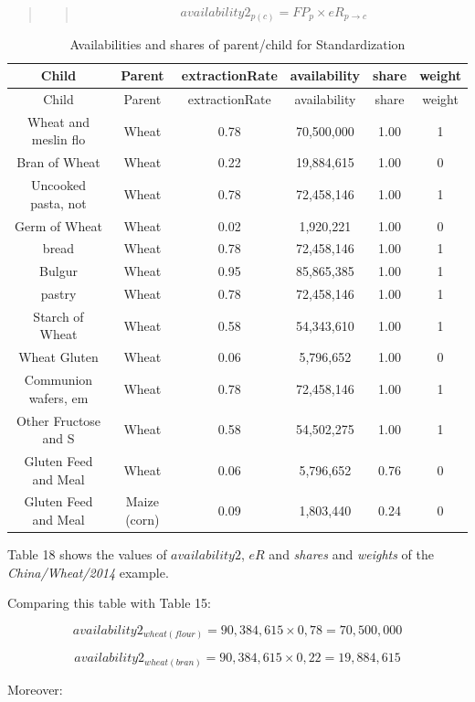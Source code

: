\documentclass[]{article}
\begin{document}
\begin{quote}
\begin{quote}
\begin{equation}
\label{eq:availability2}
availability2_{p(c)} = FP_{p}\times eR_{p\to c}
\end{equation}
\end{quote}
\end{quote}

\begin{longtable}[]{@{}cccccc@{}}
\caption{Availabilities and shares of parent/child for
Standardization}\tabularnewline
\toprule
Child & Parent & extractionRate & availability & share &
weight\tabularnewline
\midrule
\endfirsthead
\toprule
Child & Parent & extractionRate & availability & share &
weight\tabularnewline
\midrule
\endhead
Wheat and meslin flo & Wheat & 0.78 & 70,500,000 & 1.00 &
1\tabularnewline
Bran of Wheat & Wheat & 0.22 & 19,884,615 & 1.00 & 0\tabularnewline
Uncooked pasta, not & Wheat & 0.78 & 72,458,146 & 1.00 &
1\tabularnewline
Germ of Wheat & Wheat & 0.02 & 1,920,221 & 1.00 & 0\tabularnewline
bread & Wheat & 0.78 & 72,458,146 & 1.00 & 1\tabularnewline
Bulgur & Wheat & 0.95 & 85,865,385 & 1.00 & 1\tabularnewline
pastry & Wheat & 0.78 & 72,458,146 & 1.00 & 1\tabularnewline
Starch of Wheat & Wheat & 0.58 & 54,343,610 & 1.00 & 1\tabularnewline
Wheat Gluten & Wheat & 0.06 & 5,796,652 & 1.00 & 0\tabularnewline
Communion wafers, em & Wheat & 0.78 & 72,458,146 & 1.00 &
1\tabularnewline
Other Fructose and S & Wheat & 0.58 & 54,502,275 & 1.00 &
1\tabularnewline
Gluten Feed and Meal & Wheat & 0.06 & 5,796,652 & 0.76 &
0\tabularnewline
Gluten Feed and Meal & Maize (corn) & 0.09 & 1,803,440 & 0.24 &
0\tabularnewline
\bottomrule
\end{longtable}

Table 18 shows the values of \(availability2\), \(eR\) and \emph{shares}
and \emph{weights} of the \emph{China/Wheat/2014} example.

Comparing this table with Table 15:

\begin{equation}
\label{eq:avExample1}
availability2_{wheat(flour)} = 90,384,615\times 0,78 = 70,500,000
\end{equation}

\begin{equation}
\label{eq:avExample2}
availability2_{wheat(bran)} = 90,384,615\times 0,22 = 19,884,615
\end{equation}

Moreover:
\end{document}

